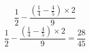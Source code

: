 \documentclass[11pt]{article}
\begin{document}
\centering
\[
\frac{1}{2} - \frac{(\frac{1}{4} - \frac{4}{5}) \times 2}{9}
\]
\[
\frac{1}{2} - \frac{(\frac{1}{4} - \frac{4}{5}) \times 2}{9} = \frac{28}{45}
\]
\end{document}
